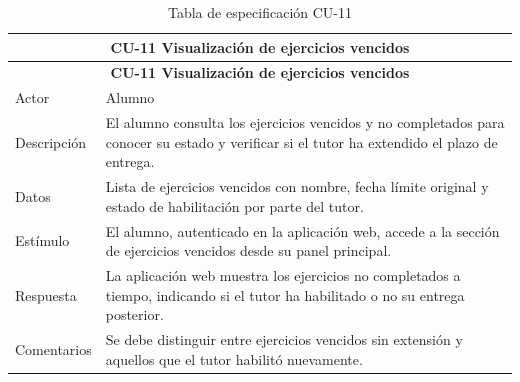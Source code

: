 \begin{longtable}{|p{4cm}|p{11cm}|}
\caption{Tabla de especificación CU-11}
\label{tab:cu11} \\

\hline
\multicolumn{2}{|c|}{\textbf{CU-11 Visualización de ejercicios vencidos}} \\
\hline
\endfirsthead

\hline
\multicolumn{2}{|c|}{\textbf{CU-11 Visualización de ejercicios vencidos}} \\
\hline
\endhead

\hline
\endfoot
\endlastfoot

Actor & Alumno \\
\hline

Descripción & El alumno consulta los ejercicios vencidos y no completados para conocer su estado y verificar si el tutor ha extendido el plazo de entrega. \\
\hline

Datos & Lista de ejercicios vencidos con nombre, fecha límite original y estado de habilitación por parte del tutor. \\
\hline

Estímulo & El alumno, autenticado en la aplicación web, accede a la sección de ejercicios vencidos desde su panel principal. \\
\hline

Respuesta & La aplicación web muestra los ejercicios no completados a tiempo, indicando si el tutor ha habilitado o no su entrega posterior. \\
\hline

Comentarios & Se debe distinguir entre ejercicios vencidos sin extensión y aquellos que el tutor habilitó nuevamente. \\
\hline

\end{longtable}


